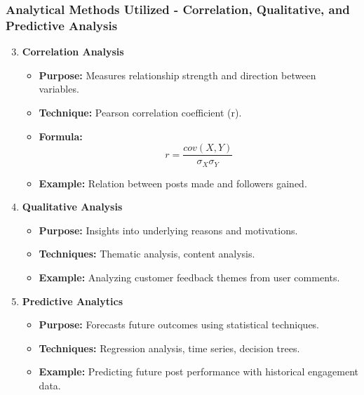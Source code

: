 \documentclass{beamer}
\begin{document}
\begin{frame}[fragile]
    \frametitle{Analytical Methods Utilized - Correlation, Qualitative, and Predictive Analysis}
    \begin{enumerate}
        \setcounter{enumi}{2}
        \item \textbf{Correlation Analysis}
        \begin{itemize}
            \item \textbf{Purpose:} Measures relationship strength and direction between variables.
            \item \textbf{Technique:} Pearson correlation coefficient (r).
            \item \textbf{Formula:} 
            \begin{equation}
                r = \frac{cov(X, Y)}{\sigma_X \sigma_Y}
            \end{equation}
            \item \textbf{Example:} Relation between posts made and followers gained.
        \end{itemize}

        \item \textbf{Qualitative Analysis}
        \begin{itemize}
            \item \textbf{Purpose:} Insights into underlying reasons and motivations.
            \item \textbf{Techniques:} Thematic analysis, content analysis.
            \item \textbf{Example:} Analyzing customer feedback themes from user comments.
        \end{itemize}

        \item \textbf{Predictive Analytics}
        \begin{itemize}
            \item \textbf{Purpose:} Forecasts future outcomes using statistical techniques.
            \item \textbf{Techniques:} Regression analysis, time series, decision trees.
            \item \textbf{Example:} Predicting future post performance with historical engagement data.
        \end{itemize}
    \end{enumerate}
\end{frame}
\end{document}
